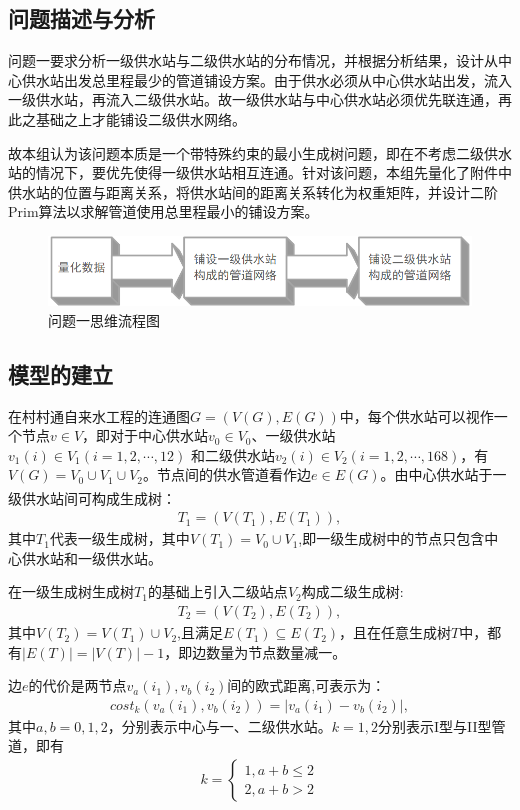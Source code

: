 \documentclass{whutmod}
\newcommand{\upcite}[1]{\textsuperscript{\cite{#1}}}
\begin{document}
		\subsection{问题描述与分析}
			问题一要求分析一级供水站与二级供水站的分布情况，并根据分析结果，设计从中心供水站出发总里程最少的管道铺设方案。由于供水必须从中心供水站出发，流入一级供水站，再流入二级供水站。故一级供水站与中心供水站必须优先联连通，再此之基础之上才能铺设二级供水网络。
			
			故本组认为该问题本质是一个带特殊约束的最小生成树问题，即在不考虑二级供水站的情况下，要优先使得一级供水站相互连通。针对该问题，本组先量化了附件中供水站的位置与距离关系，将供水站间的距离关系转化为权重矩阵，并设计二阶Prim算法以求解管道使用总里程最小的铺设方案。
			
		
			\begin{figure}[H]
				\centering
				\includegraphics[width=\textwidth]{figures/chou.png}
				\caption{问题一思维流程图}\label{lct}
			\end{figure}
			
		\subsection{模型的建立}
		在村村通自来水工程的连通图$G=(V(G),E(G))$中，每个供水站可以视作一个节点$v \in V$，即对于中心供水站$v_0 \in V_0$、一级供水站$v_1(i) \in V_1 (i=1,2,\cdots,12)$ 和二级供水站$v_2(i) \in V_2 (i=1,2,\cdots,168)$，有$V(G)=V_0\cup  V_1\cup V_2$。节点间的供水管道看作边$e \in E(G)$。由中心供水站于一级供水站间可构成生成树\upcite{6}：
		\begin{gather*}
		T_{1}=(V(T_{1}),E(T_{1})),
		\end{gather*}
		其中$T_{1}$代表一级生成树，其中$V(T_{1})=V_0\cup V_1$,即一级生成树中的节点只包含中心供水站和一级供水站。
		
		在一级生成树生成树$T_1$的基础上引入二级站点$V_2$构成二级生成树:
		\begin{gather*}	
		T_{2}=(V(T_{2}),E(T_{2})),
		\end{gather*}
		其中$V(T_{2})=V(T_{1})\cup V_2$,且满足$E(T_{1})\subseteq  E(T_{2})$，且在任意生成树$T$中，都有$|E(T)|=|V(T)|-1$，即边数量为节点数量减一。
		
		边$e$的代价是两节点$v_a(i_1), v_b(i_2)$间的欧式距离,可表示为：
		\begin{gather}
		cost_{k}(v_a(i_1),v_b(i_2))=\left | v_a(i_1)-v_b(i_2) \right |,
		\end{gather}
		其中$a,b=0,1,2$，分别表示中心与一、二级供水站。$k=1,2$分别表示I型与II型管道，即有
			\begin{gather}
			k=\left\{\begin{matrix}1,a+b\leqslant 2
			\\ 2,a+b>2
			\end{matrix}\right .
			\end{gather}
		
\end{document}
